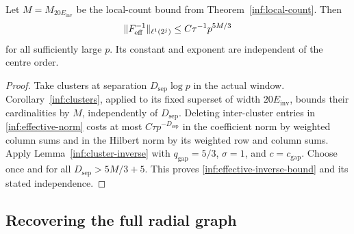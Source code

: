 \begin{corollary}
\label{inf:effective-inverse}
Let $M=M_{20E_{\mathrm{inv}}}$ be the local-count bound from
Theorem~\ref{inf:local-count}. Then
\begin{equation}\label{inf:effective-inverse-bound}
 \lVert F_{\mathrm{eff}}^{-1}\rVert_{\ell^1(2^j)}
                         \le C\tau^{-1}p^{5M/3}
\end{equation}
for all sufficiently large $p$.
Its constant and exponent are independent of the centre order.
\end{corollary}
\begin{proof}
Take clusters at separation $D_{\mathrm{sep}}\log p$ in the
actual window. Corollary~\ref{inf:clusters}, applied to its fixed
superset of width $20E_{\mathrm{inv}}$, bounds their cardinalities
by $M$, independently of $D_{\mathrm{sep}}$.
Deleting inter-cluster entries in \eqref{inf:effective-norm}
costs at most $C\tau p^{-D_{\mathrm{sep}}}$ in the coefficient
norm by weighted column sums and in the Hilbert norm by its
weighted row and column sums. Apply
Lemma~\ref{inf:cluster-inverse} with $q_{\mathrm{gap}}=5/3$, $\sigma=1$, and
$c=c_{\mathrm{gap}}$.
Choose once and for all
$D_{\mathrm{sep}}>5M/3+5$.
This proves \eqref{inf:effective-inverse-bound} and its stated
independence.
\end{proof}

\subsection{Recovering the full radial graph}

